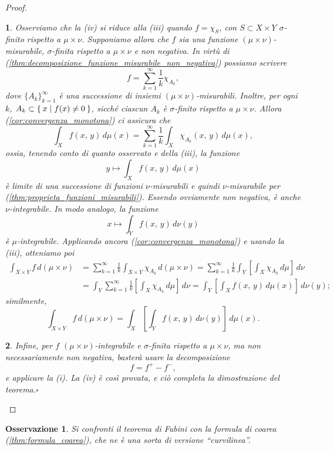 \documentclass[a4paper,10pt,openright,oneside]{book}
\theoremstyle{theoremstyle}
\theoremstyle{theoremstylewoheader}
\theoremstyle{theoremstyle}
\newtheorem{osservazione}[teorema]{Osservazione}
\theoremstyle{proofsecstyle}
\newtheorem{proofsec}{}
\theoremstyle{nonumberplain}
\newtheorem{proof}{Dim.}
\renewcommand{\qedsymbol}{\ensuremath{\square}}
\newcommand{\qed}{\unskip\nobreak\hfill\nobreak\hspace{.5em}\qedsymbol}
\begin{document}
\begin{proof}
\begin{proofsec}
Osserviamo che la (iv) si riduce alla (iii) quando $f = \chi_S$, con $S \subset X \times Y$ $\sigma$-finito rispetto a $\mu\times\nu$. Supponiamo allora che $f$ sia una funzione $(\mu\times\nu)$-misurabile, $\sigma$-finita rispetto a $\mu\times\nu$ e \emph{non negativa}. In virtù di (\ref{thm:decomposizione_funzione_misurabile_non_negativa}) possiamo scrivere
\[
f = \sum_{k=1}^\infty \frac{1}{k} \chi_{A_k},
\]
dove $\{A_k\}_{k=1}^\infty$ è una successione di insiemi $(\mu\times\nu)$-misurabili. Inoltre, per ogni $k$, $A_k \subset \Set{ x | f(x) \ne 0 }$, sicché ciascun $A_k$ è $\sigma$-finito rispetto a $\mu\times\nu$. Allora (\ref{cor:convergenza_monotona}) ci assicura che
\[
\int_X f(x,\, y)\, d\mu(x) = \sum_{k=1}^\infty \frac{1}{k} \int_X \chi_{A_k} (x,\, y)\, d\mu(x),
\]
ossia, tenendo conto di quanto osservato e della (iii), la funzione
\[
y \mapsto \int_X f(x,\, y)\, d\mu(x)
\]
è limite di una successione di funzioni $\nu$-misurabili e quindi $\nu$-misurabile per (\ref{thm:proprieta_funzioni_misurabili}). Essendo ovviamente non negativa, è anche $\nu$-integrabile. In modo analogo, la funzione
\[
x \mapsto \int_Y f(x,\, y)\, d\nu(y)
\]
è $\mu$-integrabile. Applicando ancora (\ref{cor:convergenza_monotona}) e usando la (iii), otteniamo poi
\begin{align*}
\int_{X \times Y} f\, d(\mu\times\nu) &= \sum_{k=1}^\infty \frac{1}{k} \int_{X \times Y} \chi_{A_k}\, d(\mu\times\nu) = \sum_{k=1}^\infty \frac{1}{k} \int_Y \left[\int_X \chi_{A_k}\, d\mu\right]\, d\nu\\
&= \int_Y \sum_{k=1}^\infty \frac{1}{k} \left[\int_X \chi_{A_k}\, d\mu\right]\, d\nu = \int_Y \left[\int_X f(x,\, y)\, d\mu(x)\right]\, d\nu(y);
\end{align*}
similmente,
\[
\int_{X \times Y} f\, d(\mu\times\nu) = \int_X \left[\int_Y f(x,\, y)\, d\nu(y)\right]\, d\mu(x).
\]
\end{proofsec}

\begin{proofsec}
Infine, per $f$ $(\mu\times\nu)$-integrabile e $\sigma$-finita rispetto a $\mu\times\nu$, ma non necessariamente non negativa, basterà usare la decomposizione 
\[
f = f^+ - f^-,
\]
e applicare la (i). La (iv) è così provata, e ciò completa la dimostrazione del teorema.\qed
\end{proofsec}
\end{proof}

\begin{osservazione}
Si confronti il teorema di Fubini con la formula di coarea (\ref{thm:formula_coarea}), che ne è una sorta di versione ``curvilinea''.
\end{osservazione}
\end{document}
